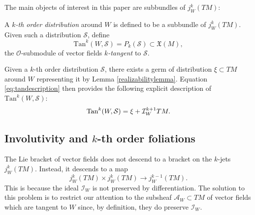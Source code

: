 \documentclass[10pt]{amsart}
\newcommand{\X}{{\mathfrak{X}}}
\numberwithin{theoremalpha}{section}
\numberwithin{equation}{section}
\numberwithin{definition}{section}
\numberwithin{theorem}{section}
\numberwithin{proposition}{section}
\numberwithin{lemma}{section}
\numberwithin{example}{section}
\numberwithin{remark}{section}
\numberwithin{corollary}{section}
\numberwithin{question}{section}
\numberwithin{problem}{section}
\numberwithin{assumption}{section}
\theoremstyle{named}
\numberwithin{equation}{section}
\begin{document}
The main objects of interest in this paper are subbundles of $j_W^k(TM)$:
\begin{definition}
A \emph{$k$-th order distribution} around $W$ is defined to be a subbundle of $j_{W}^{k}(TM)$. Given such a distribution $\mathcal{S}$, define 
\[ \mathrm{Tan}^{k}(W, \mathcal{S}) = P_{k}(\mathcal{S}) \subset \X(M),  \]
the $\mathcal{O}$-submodule of vector fields \emph{$k$-tangent} to $\mathcal{S}$.  
\end{definition}

Given a $k$-th order distribution $\mathcal{S}$, there exists a germ of distribution $\xi \subset TM$ around $W$ representing it by Lemma \ref{realizabilitylemma}. Equation \eqref{eq:tandescription} then provides the following explicit description of $\mathrm{Tan}^{k}(W, \mathcal{S})$:
\[ \mathrm{Tan}^{k}(W, \mathcal{S}) = \xi + \mathcal{I}_W^{k+1}TM.\hfill \]



\subsection{Involutivity and $k$-th order foliations} \label{ssec:LieRiehart}

The Lie bracket of vector fields does not descend to a bracket on the $k$-jets $j_{W}^{k}(TM)$. Instead, it descends to a map 
\[
j_{W}^{k}(TM) \times j_{W}^{k}(TM) \to j_{W}^{k-1}(TM). 
\]
This is because the ideal $\mathcal{I}_W$ is not preserved by differentiation. The solution to this problem is to restrict our attention to the subsheaf $\mathcal{A}_{W} \subset TM$ of vector fields which are tangent to $W$ since, by definition, they do preserve $\mathcal{I}_W$.
\end{document}
